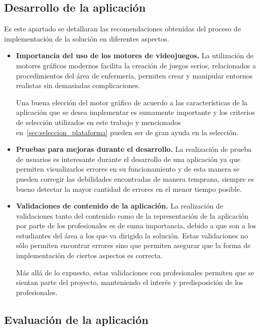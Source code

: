 \subsection{Desarrollo de la aplicación}

Es este apartado se detallaran las recomendaciones obtenidas del proceso de
implementación de la solución en diferentes aspectos. 

\begin{itemize}

\item \textbf{Importancia del uso de los motores de videojuegos.} La utilización
    de motores gráficos modernos facilita la creación de juegos serios,
    relacionados a procedimientos del área de enfermería, permiten crear y
    manipular entornos realistas sin demasiadas complicaciones. 

    Una buena elección del motor gráfico de acuerdo a las características de la
    aplicación que se desea implementar es sumamente importante y los criterios
    de selección utilizados en este trabajo y mencionados
    en~\ref{sec:seleccion_plataforma} pueden ser de gran ayuda en la selección.

\item \textbf{Pruebas para mejoras durante el desarrollo.} La realización de
    prueba de usuarios es interesante durante el desarrollo de una aplicación ya
    que permiten visualizarlos errores en su funcionamiento y de esta manera se
    pueden corregir las debilidades encontradas de manera temprana, siempre es
    bueno detectar la mayor cantidad de errores en el menor tiempo posible.

\item \textbf{Validaciones de contenido de la aplicación.} La realización de
    validaciones tanto del contenido como de la representación de la aplicación
    por parte de los profesionales es de suma importancia, debido a que son a
    los estudiantes del área a los que va dirigido la solución. Estas
    validaciones no sólo permiten encontrar errores sino que permiten asegurar
    que la forma de implementación de ciertos aspectos es correcta. 

    Más allá de lo expuesto, estas validaciones con profesionales permiten que
    se sientan parte del proyecto, manteniendo el interés y predisposición de
    los profesionales.

\end{itemize}


\subsection{Evaluación de la aplicación}

